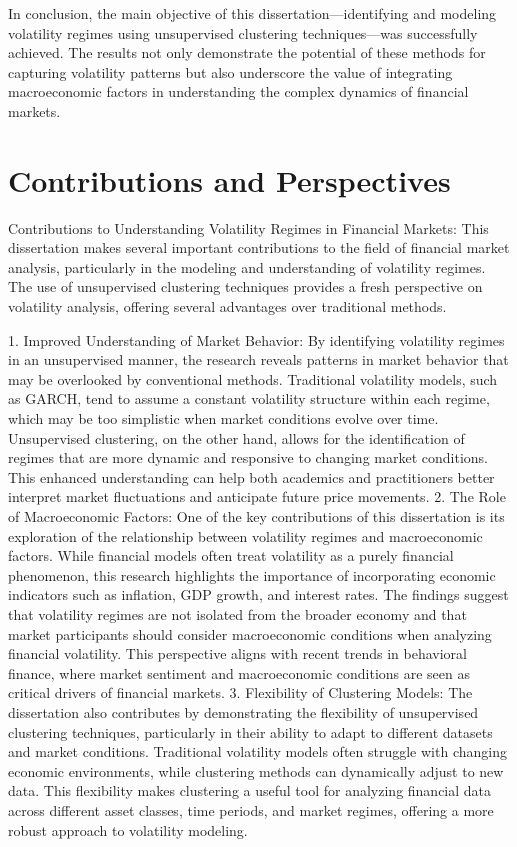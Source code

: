 In conclusion, the main objective of this dissertation—identifying and modeling volatility regimes using unsupervised clustering techniques—was successfully achieved. The results not only demonstrate the potential of these methods for capturing volatility patterns but also underscore the value of integrating macroeconomic factors in understanding the complex dynamics of financial markets.

\section{Contributions and Perspectives}

Contributions to Understanding Volatility Regimes in Financial Markets:
This dissertation makes several important contributions to the field of financial market analysis, particularly in the modeling and understanding of volatility regimes. The use of unsupervised clustering techniques provides a fresh perspective on volatility analysis, offering several advantages over traditional methods.

1.	Improved Understanding of Market Behavior: By identifying volatility regimes in an unsupervised manner, the research reveals patterns in market behavior that may be overlooked by conventional methods. Traditional volatility models, such as GARCH, tend to assume a constant volatility structure within each regime, which may be too simplistic when market conditions evolve over time. Unsupervised clustering, on the other hand, allows for the identification of regimes that are more dynamic and responsive to changing market conditions. This enhanced understanding can help both academics and practitioners better interpret market fluctuations and anticipate future price movements.
2.	The Role of Macroeconomic Factors: One of the key contributions of this dissertation is its exploration of the relationship between volatility regimes and macroeconomic factors. While financial models often treat volatility as a purely financial phenomenon, this research highlights the importance of incorporating economic indicators such as inflation, GDP growth, and interest rates. The findings suggest that volatility regimes are not isolated from the broader economy and that market participants should consider macroeconomic conditions when analyzing financial volatility. This perspective aligns with recent trends in behavioral finance, where market sentiment and macroeconomic conditions are seen as critical drivers of financial markets.
3.	Flexibility of Clustering Models: The dissertation also contributes by demonstrating the flexibility of unsupervised clustering techniques, particularly in their ability to adapt to different datasets and market conditions. Traditional volatility models often struggle with changing economic environments, while clustering methods can dynamically adjust to new data. This flexibility makes clustering a useful tool for analyzing financial data across different asset classes, time periods, and market regimes, offering a more robust approach to volatility modeling.

